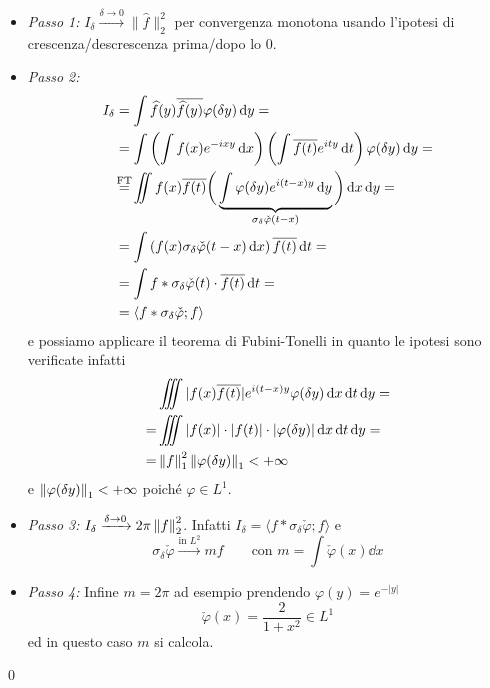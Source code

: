 \begin{itemize}
	\item \textit{Passo 1:}
		$I_\delta \xrightarrow{\delta \to 0} \| \hat f \|_2^2$ per convergenza monotona usando l'ipotesi di crescenza/descrescenza prima/dopo lo $0$.

	\item \textit{Passo 2:}
		$$
		\begin{aligned}
			I_\delta 
			&= \int \hat f(y) \overline{\hat f(y)} \varphi(\delta y) \dd y = \\
			&= \int \left( \int f(x) e^{-ixy} \dd x \right) \left( \int \overline{f(t)} e^{ity} \dd t \right) \varphi(\delta y) \dd y = \\
			&\overset{\mathclap{\text{FT}}}{=} 
			\iint f(x) \overline{f(t)} 
			\bigg( \underbrace{\int \varphi(\delta y) e^{i(t-x)y} \dd y}_{\sigma_\delta \check \varphi(t - x)} \bigg)
			\dd x \dd y = \\
			&= \int \left( f(x) \sigma_\delta \check\varphi(t - x) \dd x \right) \overline{f(t)} \dd t =\\
			&= \int f \ast \sigma_\delta \check \varphi(t) \cdot \overline{f(t)} \dd t = \\
			&= \langle f \ast \sigma_\delta \check \varphi; f \rangle \\
		\end{aligned}
		$$
		e possiamo applicare il teorema di Fubini-Tonelli in quanto le ipotesi sono verificate infatti
		$$
		\begin{aligned}
			&\iiint |f(x) \overline{f(t)}| e^{i(t - x)y} \varphi(\delta y) \,\mathrm{d} x \,\mathrm{d} t \,\mathrm{d} y = \\
			= &\iiint |f(x)| \cdot |f(t)| \cdot |\varphi(\delta y)| \,\mathrm{d} x \,\mathrm{d} t \,\mathrm{d} y = \\
			= &\left\lVert f \right\rVert_1^2 \left\lVert \varphi(\delta y) \right\rVert_1 < +\infty
		\end{aligned}
		$$
		e $\left\lVert \varphi(\delta y) \right\rVert_1 < +\infty$ poiché $\varphi \in L^1$.

	\item \textit{Passo 3:}
		$I_\delta \xrightarrow{\delta \to 0} 2\pi \left\lVert f \right\rVert_2^2 $. Infatti $I_\delta = \langle f \ast \sigma_\delta \check \varphi; f \rangle$ e
		$$
		\sigma_\delta \check \varphi \xrightarrow{\text{in $L^2$}} m f
		\qquad
		\text{con }
		m = \int \check \varphi(x) \dd x
		$$

	\item \textit{Passo 4:}
		Infine $m = 2\pi$ ad esempio prendendo $\varphi(y) = e^{-|y|}$
		$$
		\check\varphi(x) = \frac{2}{1 + x^2} \in L^1
		$$
		ed in questo caso $m$ si calcola.
\end{itemize}
\qed

